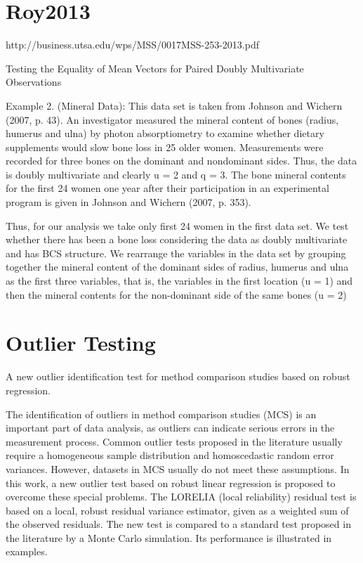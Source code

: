 \documentclass[12pt, a4paper]{report}
\theoremstyle{plain}
\theoremstyle{definition}
\theoremstyle{remark}
\begin{document}
\section{Roy2013}

http://business.utsa.edu/wps/MSS/0017MSS-253-2013.pdf


Testing the Equality of Mean Vectors for Paired Doubly Multivariate Observations 


Example 2. (Mineral Data): This data set is taken from Johnson and Wichern (2007, p. 43).
An investigator measured the mineral content of bones (radius, humerus and ulna) by photon
absorptiometry to examine whether dietary supplements would slow bone loss in 25 older women.
Measurements were recorded for three bones on the dominant and nondominant sides. Thus,
the data is doubly multivariate and clearly u = 2 and q = 3.
The bone mineral contents for the ﬁrst 24 women one year after their participation in an
experimental program is given in Johnson and Wichern (2007, p. 353). 



Thus, for our analysis
we take only ﬁrst 24 women in the ﬁrst data set. We test whether there has been a bone loss
considering the data as doubly multivariate and has BCS structure. We rearrange the variables
in the data set by grouping together the mineral content of the dominant sides of radius, humerus
and ulna as the ﬁrst three variables, that is, the variables in the ﬁrst location (u = 1) and then
the mineral contents for the non-dominant side of the same bones (u = 2)



\section{Outlier Testing} 
A new outlier identification test for method comparison studies based on robust regression.

The identification of outliers in method comparison studies (MCS) is an important part of data analysis, as outliers can indicate serious errors in the measurement process. Common outlier tests proposed in the literature usually require a homogeneous sample distribution and homoscedastic random error variances. However, datasets in MCS usually do not meet these assumptions. In this work, a new outlier test based on robust linear regression is proposed to overcome these special problems. The LORELIA (local reliability) residual test is based on a local, robust residual variance estimator, given as a weighted sum of the observed residuals. The new test is compared to a standard test proposed in the literature by a Monte Carlo simulation. Its performance is illustrated in examples.
\end{document}
